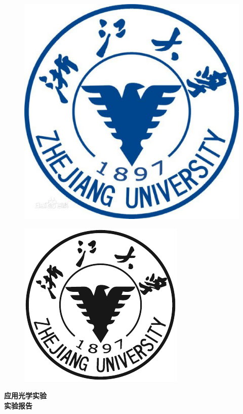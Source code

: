 \documentclass{article}
\begin{document}
\begin{titlepage}
        \vspace*{-3cm}
	
	\begin{figure}[h]
		\centering
		\includegraphics[width=0.7\linewidth]{zjdx}
	\end{figure}

	\vspace*{0.5cm}
	\begin{figure}[h]
		\centering
		\includegraphics[width=0.5\linewidth]{QSY}
	\end{figure}
	\vspace{-0.5cm}
	\begin{center}
		\Huge{\textbf{应用光学实验}}\\
		
		\Huge{\textbf{实验报告}}
	\end{center}
	
	\vspace*{0.5cm}



\end{titlepage}
\end{document}
